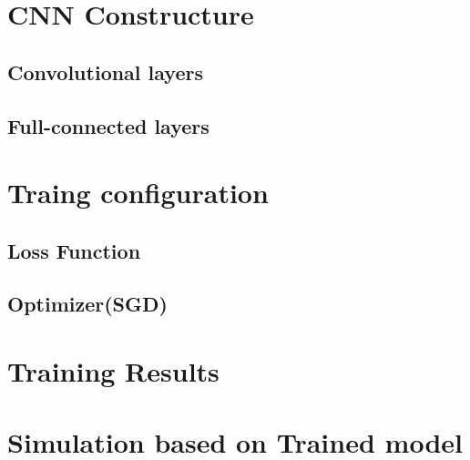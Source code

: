     

\section{CNN Constructure}
    \subsection{Convolutional layers}

    \subsection{Full-connected layers}

\section{Traing configuration}
    \subsection{Loss Function}

    \subsection{Optimizer(SGD)}

\section{Training Results}

\section{Simulation based on Trained model}
